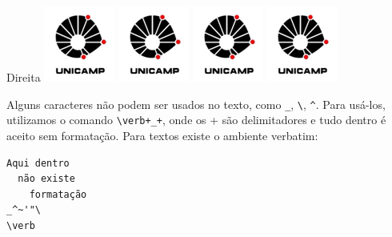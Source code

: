 \documentclass[letterpaper,11pt]{article}
\begin{document}
\begin{flushright}
 Direita
 \includegraphics[scale=0.25]{logo.png}
 \includegraphics[scale=0.5]{logo.png}
 \includegraphics[scale=1.0]{logo.png}
 \includegraphics[scale=2.0]{logo.png}
\end{flushright}

Alguns caracteres não podem ser usados no texto, como \verb+_+, \verb+\+, \verb+^+. Para usá-los, utilizamos o comando \verb-\verb+_+-, onde os + são delimitadores e tudo dentro é aceito sem formatação. Para textos existe o
ambiente verbatim:
\begin{verbatim}
Aqui dentro
  não existe
    formatação
_^~'"\
\verb
\end{verbatim}
\end{document}
